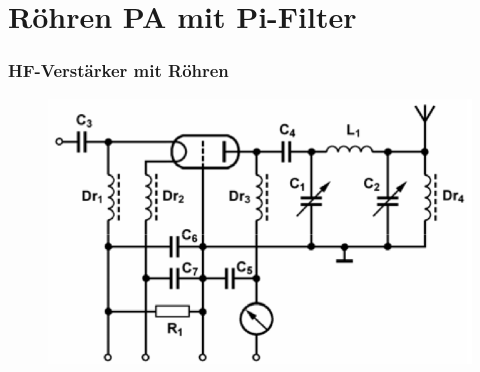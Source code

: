 

\subtitle{Technik A17: \\
  Schaltungstechnik \\[2em]}
\date{Stand 06.03.2017}


\section*{Röhren PA mit Pi-Filter}
\begin{frame}
  \frametitle{HF-Verstärker mit Röhren}
  \begin{center}
    \begin{figure}
      \includegraphics[width=1\textwidth,height=.75\textheight,keepaspectratio]{a17/TG313.png}
    \end{figure}
  \end{center}
\end{frame}

